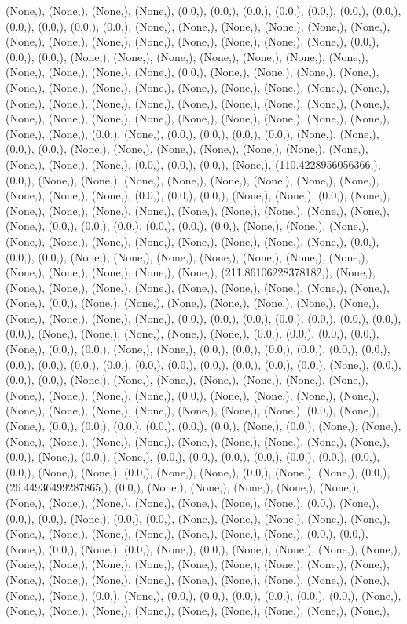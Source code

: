 \documentclass{article}
\begin{document}
(None,), (None,), (None,), (None,), (0.0,), (0.0,), (0.0,), (0.0,), (0.0,), (0.0,), (0.0,), (0.0,), (0.0,), (0.0,), (0.0,), (None,), (None,), (None,), (None,), (None,), (None,), (None,), (None,), (None,), (None,), (None,), (None,), (None,), (None,), (0.0,), (0.0,), (0.0,), (None,), (None,), (None,), (None,), (None,), (None,), (None,), (None,), (None,), (None,), (None,), (0.0,), (None,), (None,), (None,), (None,), (None,), (None,), (None,), (None,), (None,), (None,), (None,), (None,), (None,), (None,), (None,), (None,), (None,), (None,), (None,), (None,), (None,), (None,), (None,), (None,), (None,), (None,), (None,), (None,), (None,), (None,), (None,), (None,), (None,), (0.0,), (None,), (0.0,), (0.0,), (0.0,), (0.0,), (None,), (None,), (0.0,), (0.0,), (None,), (None,), (None,), (None,), (None,), (None,), (None,), (None,), (None,), (None,), (0.0,), (0.0,), (0.0,), (None,), (110.4228956056366,), (0.0,), (None,), (None,), (None,), (None,), (None,), (None,), (None,), (None,), (None,), (None,), (None,), (0.0,), (0.0,), (0.0,), (None,), (None,), (0.0,), (None,), (None,), (None,), (None,), (None,), (None,), (None,), (None,), (None,), (None,), (None,), (0.0,), (0.0,), (0.0,), (0.0,), (0.0,), (0.0,), (None,), (None,), (None,), (None,), (None,), (None,), (None,), (None,), (None,), (None,), (None,), (0.0,), (0.0,), (0.0,), (None,), (None,), (None,), (None,), (None,), (None,), (None,), (None,), (None,), (None,), (None,), (None,), (211.86106228378182,), (None,), (None,), (None,), (None,), (None,), (None,), (None,), (None,), (None,), (None,), (None,), (0.0,), (None,), (None,), (None,), (None,), (None,), (None,), (None,), (None,), (None,), (None,), (None,), (0.0,), (0.0,), (0.0,), (0.0,), (0.0,), (0.0,), (0.0,), (0.0,), (None,), (None,), (None,), (None,), (None,), (0.0,), (0.0,), (0.0,), (0.0,), (None,), (0.0,), (0.0,), (None,), (None,), (0.0,), (0.0,), (0.0,), (0.0,), (0.0,), (0.0,), (0.0,), (0.0,), (0.0,), (0.0,), (0.0,), (0.0,), (0.0,), (0.0,), (0.0,), (0.0,), (None,), (0.0,), (0.0,), (0.0,), (None,), (None,), (None,), (None,), (None,), (None,), (None,), (None,), (None,), (None,), (None,), (0.0,), (None,), (None,), (None,), (None,), (None,), (None,), (None,), (None,), (None,), (None,), (None,), (0.0,), (None,), (None,), (0.0,), (0.0,), (0.0,), (0.0,), (0.0,), (0.0,), (None,), (0.0,), (None,), (None,), (None,), (None,), (None,), (None,), (None,), (None,), (None,), (None,), (None,), (0.0,), (None,), (0.0,), (None,), (0.0,), (0.0,), (0.0,), (0.0,), (0.0,), (0.0,), (0.0,), (0.0,), (None,), (None,), (0.0,), (None,), (None,), (0.0,), (None,), (None,), (0.0,), (26.44936499287865,), (0.0,), (None,), (None,), (None,), (None,), (None,), (None,), (None,), (None,), (None,), (None,), (None,), (None,), (0.0,), (None,), (0.0,), (0.0,), (None,), (0.0,), (0.0,), (None,), (None,), (None,), (None,), (None,), (None,), (None,), (None,), (None,), (None,), (None,), (None,), (0.0,), (0.0,), (None,), (0.0,), (None,), (0.0,), (None,), (0.0,), (None,), (None,), (None,), (None,), (None,), (None,), (None,), (None,), (None,), (None,), (None,), (None,), (None,), (None,), (None,), (None,), (None,), (None,), (None,), (None,), (None,), (None,), (None,), (None,), (0.0,), (None,), (0.0,), (0.0,), (0.0,), (0.0,), (0.0,), (0.0,), (None,), (None,), (None,), (None,), (None,), (None,), (None,), (None,), (None,), (None,), 
\end{document}
